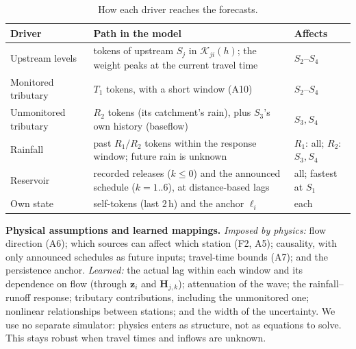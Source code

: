 \documentclass[11pt,a4paper]{article}
\newcommand{\K}{\mathcal{K}}
\begin{document}
\begin{table}[H]
\centering\small
\caption{How each driver reaches the forecasts.}
\label{tab:drivers}
\begin{tabularx}{\textwidth}{@{}l L l@{}}
\toprule
\textbf{Driver} & \textbf{Path in the model} & \textbf{Affects} \\
\midrule
Upstream levels & tokens of upstream $S_j$ in $\K_{ji}(h)$; the weight peaks at the current travel time & $S_2$--$S_4$ \\
Monitored tributary & $T_1$ tokens, with a short window (A10) & $S_2$--$S_4$ \\
Unmonitored tributary & $R_2$ tokens (its catchment's rain), plus $S_3$'s own history (baseflow) & $S_3,S_4$ \\
Rainfall & past $R_1/R_2$ tokens within the response window; future rain is unknown & $R_1$: all; $R_2$: $S_3,S_4$ \\
Reservoir & recorded releases ($k\le0$) and the announced schedule ($k=1..6$), at distance-based lags & all; fastest at $S_1$ \\
Own state & self-tokens (last 2\,h) and the anchor $\ell_i$ & each \\
\bottomrule
\end{tabularx}
\end{table}

\textbf{Physical assumptions and learned mappings.} \emph{Imposed by physics:}
flow direction (A6); which sources can affect which station (F2, A5);
causality, with only announced schedules as future inputs; travel-time bounds
(A7); and the persistence anchor. \emph{Learned:} the actual lag within each
window and its dependence on flow (through $\mathbf{z}_i$ and
$\mathbf{H}_{j,k}$); attenuation of the wave; the rainfall--runoff response;
tributary contributions, including the unmonitored one; nonlinear
relationships between stations; and the width of the uncertainty.
We use no separate simulator: physics enters as structure, not as equations to
solve. This stays robust when travel times and inflows are unknown.
\end{document}

